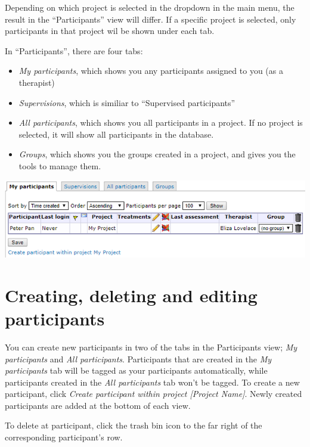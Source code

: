 \documentclass[]{book}
\providecommand{\tightlist}{%
  \setlength{\itemsep}{0pt}\setlength{\parskip}{0pt}}
\begin{document}
Depending on which project is selected in the dropdown in the main menu, the result in the ``Participants'' view will differ. If a specific project is selected, only participants in that project wil be shown under each tab.

In ``Participants'', there are four tabs:

\begin{itemize}
\tightlist
\item
  \emph{My participants}, which shows you any participants assigned to you (as a therapist)
\item
  \emph{Supervisions}, which is similiar to ``Supervised participants''
\item
  \emph{All participants}, which shows you all participants in a project. If no project is selected, it will show all participants in the database.
\item
  \emph{Groups}, which shows you the groups created in a project, and gives you the tools to manage them.
\end{itemize}

\includegraphics{images/new-images/participantsTabs.png}

\hypertarget{creating-deleting-and-editing-participants}{%
\section{Creating, deleting and editing participants}\label{creating-deleting-and-editing-participants}}

You can create new participants in two of the tabs in the Participants view; \emph{My participants} and \emph{All participants}. Participants that are created in the \emph{My participants} tab will be tagged as your participants automatically, while participants created in the \emph{All participants} tab won't be tagged.
To create a new participant, click \emph{Create participant within project {[}Project Name{]}}. Newly created participants are added at the bottom of each view.

To delete at participant, click the trash bin icon to the far right of the corresponding participant's row.
\end{document}
